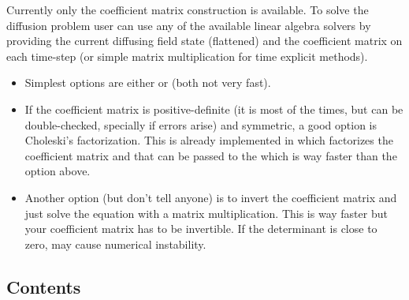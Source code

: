 \documentclass[letterpaper,10pt,english]{sphinxmanual}
\begin{document}
Currently only the coefficient matrix construction is available. To
solve the diffusion problem user can use any of the available linear
algebra solvers by providing the current diffusing field state
(flattened) and the coefficient matrix on each time-step (or simple
matrix multiplication for time explicit methods).
\begin{itemize}
\item {} 
Simplest options are either  or
 (both not very fast).

\item {} 
If the coefficient matrix is positive-definite (it is most of the
times, but can be double-checked, specially if errors arise) and
symmetric, a good option is Choleski’s factorization. This is already
implemented in  which factorizes the
coefficient matrix and that can be passed to the
 which is way faster than the option above.

\item {} 
Another option (but don’t tell anyone) is to invert the coefficient
matrix and just solve the equation with a matrix multiplication. This
is way faster but your coefficient matrix has to be invertible. If
the determinant is close to zero, may cause numerical instability.

\end{itemize}


\subsection{Contents}
\label{\detokenize{diffusion:contents}}
\end{document}
